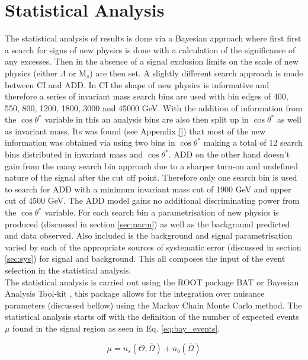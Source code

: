 \chapter{Statistical Analysis}
    \label{ch:stat}

	The statistical analysis of results is done via a Bayesian approach where first first a search for signs of new physics is done with a calculation of the significance of any excesses. Then in the absence of a signal exclusion limits on the scale of new physics (either $\Lambda$ or M$_{s}$) are then set. A slightly different search approach is made between CI and ADD. In CI the shape of new physics is informative and therefore a series of invariant mass search bins are used with bin edges of 400, 550, 800, 1200, 1800, 3000 and 45000 GeV. With the addition of information from the $\cos{\theta^{*}}$ variable in this an analysis bins are also then split up in $\cos{\theta^{*}}$ as well as invariant mass. Its was found (see Appendix \ref{}) that most of the new information was obtained via using two bins in $\cos{\theta^{*}}$ making a total of 12 search bins distributed in invariant mass and $\cos{\theta^{*}}$. ADD on the other hand doesn't gain from the many search bin approach due to a sharper turn-on and undefined nature of the signal after the cut off point. Therefore only one search bin is used to search for ADD with a minimum invariant mass cut of 1900 GeV and upper cut of 4500 GeV. The ADD model gains no additional discriminating power from the $\cos{\theta^{*}}$ variable. For each search bin a parametrisation of new physics is produced (discussed in section \ref{sec:parm}) as well as the background predicted and data observed. Also included is the background and signal parametrisation varied by each of the appropriate sources of systematic error (discussed in section \ref{sec:sys}) for signal and background. This all composes the input of the event selection in the statistical analysis. \\

    The statistical analysis is carried out using the ROOT package BAT or Bayesian Analysis Tool-kit \cite{}, this package allows for the integration over nuisance parameters (discussed bellow) using the Markov Chain Monte Carlo method.  The statistical analysis starts off with the definition of the number of expected events $\mu$ found in the signal region as seen in Eq. \ref{eq:bay_events}.

	\begin{equation}
		\mu = n_{s}(\Theta,\overline{\Omega}) + n_{b}(\overline{\Omega})
    	\label{eq:bay_events}
    \end{equation}

